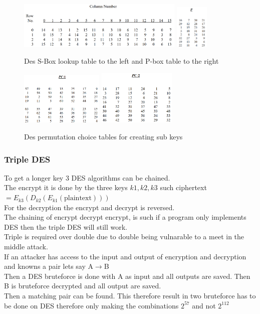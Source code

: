 \documentclass[12pt, a4paper]{article}
\begin{document}
				\begin{figure}[h!]
					\includegraphics[width=300px]{assets/desSBoxTable.png}
					\hspace{10px}
					\includegraphics[width=60px]{assets/desPBoxTable.png}
					\centering
					\caption{Des S-Box lookup table to the left and P-box table to the right}
				\end{figure}
				\begin{figure}[h!]
					\includegraphics[width=150px]{assets/desPC1.png}
					\hspace{50px}
					\includegraphics[width=140px]{assets/desPC2.png}
					\centering
					\caption{Des permutation choice tables for creating sub keys}
				\end{figure}
			\subsubsection{Triple DES}
				To get a longer key 3 DES algorithms can be chained.\\
				The encrypt it is done by the three keys $k1,k2,k3$ such ciphertext$=E_{k3}(D_{k2}(E_{k1}(\text{plaintext})))$\\
				For the decryption the encrypt and decrypt is reversed.\\
				The chaining of encrypt decrypt encrypt, is such if a program only implements DES then the triple DES will still work.\\
				Triple is required over double due to double being vulnarable to a meet in the middle attack.\\
				If an attacker has access to the input and output of encryption and decryption and knowns a pair lets say A$\rightarrow$B\\
				Then a DES bruteforce is done with A as input and all outputs are saved. Then B is bruteforce decrypted and all output are saved.\\
				Then a matching pair can be found. This therefore result in two bruteforce has to be done on DES therefore only making the combinations $2^{57}$ and not $2^{112}$
\end{document}
